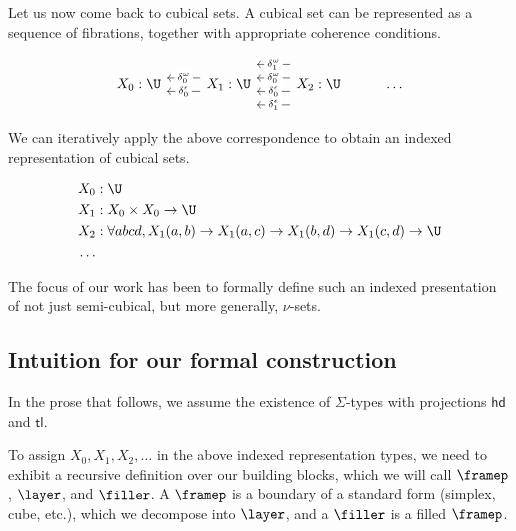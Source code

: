 \documentclass[10pt]{art.cls/art}
\newcommand{\tl}{\ensuremath{\mathsf{tl}}}
\newcommand{\hd}{\ensuremath{\mathsf{hd}}}
\begin{document}
Let us now come back to cubical sets. A cubical set can be represented as a sequence of fibrations, together with appropriate coherence conditions.

\begin{equation*}
  \begin{tikzcd}
    X_0 : \U & X_1 : \U \arrow[l, "\delta^\epsilon_0" description, shift left=2] \arrow[l, "\delta^\omega_0" description, shift right=2] & X_2 : \U \arrow[l, "\delta^\epsilon_1" description, shift left=6] \arrow[l, "\delta^\epsilon_0" description, shift left=2] \arrow[l, "\delta^\omega_0" description, shift right=2] \arrow[l, "\delta^\omega_1" description, shift right=6] & \ldots
  \end{tikzcd}
\end{equation*}

We can iteratively apply the above correspondence to obtain an indexed representation of cubical sets.

\begin{align*}
  X_0 & : \U                                                                                                              \\
  X_1 & : X_0 \times X_0 \rightarrow \U                                                                                   \\
  X_2 & : \forall a b c d, X_1 (a, b) \rightarrow X_1 (a, c) \rightarrow X_1 (b, d) \rightarrow X_1 (c, d) \rightarrow \U \\
  \ldots
\end{align*}

The focus of our work has been to formally define such an indexed presentation of not just semi-cubical, but more generally, $\nu$-sets.

\subsection{Intuition for our formal construction}
\begin{notation}[\Sigma]
  In the prose that follows, we assume the existence of $\Sigma$-types with projections $\hd$ and $\tl$.
\end{notation}

To assign $X_0, X_1, X_2, \ldots$ in the above indexed representation types, we need to exhibit a recursive definition over our building blocks, which we will call $\framep$, $\layer$, and $\filler$. A $\framep$ is a boundary of a standard form (simplex, cube, etc.), which we decompose into $\layer$, and a $\filler$ is a filled $\framep$.
\end{document}
